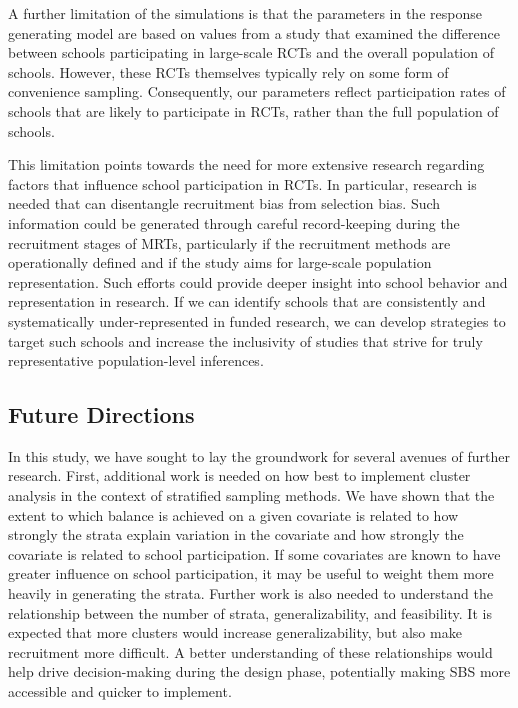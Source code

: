 \documentclass[
  english,
  man,floatsintext]{apa6}
\begin{document}
A further limitation of the simulations is that the parameters in the response generating model are based on values from a study that examined the difference between schools participating in large-scale RCTs and the overall population of schools. However, these RCTs themselves typically rely on some form of convenience sampling. Consequently, our parameters reflect participation rates of schools that are likely to participate in RCTs, rather than the full population of schools.

This limitation points towards the need for more extensive research regarding factors that influence school participation in RCTs. In particular, research is needed that can disentangle recruitment bias from selection bias. Such information could be generated through careful record-keeping during the recruitment stages of MRTs, particularly if the recruitment methods are operationally defined and if the study aims for large-scale population representation.
Such efforts could provide deeper insight into school behavior and representation in research. If we can identify schools that are consistently and systematically under-represented in funded research, we can develop strategies to target such schools and increase the inclusivity of studies that strive for truly representative population-level inferences.

\hypertarget{future-directions}{%
\subsection{Future Directions}\label{future-directions}}

In this study, we have sought to lay the groundwork for several avenues of further research. First, additional work is needed on how best to implement cluster analysis in the context of stratified sampling methods. We have shown that the extent to which balance is achieved on a given covariate is related to how strongly the strata explain variation in the covariate and how strongly the covariate is related to school participation. If some covariates are known to have greater influence on school participation, it may be useful to weight them more heavily in generating the strata. Further work is also needed to understand the relationship between the number of strata, generalizability, and feasibility. It is expected that more clusters would increase generalizability, but also make recruitment more difficult. A better understanding of these relationships would help drive decision-making during the design phase, potentially making SBS more accessible and quicker to implement.
\end{document}
